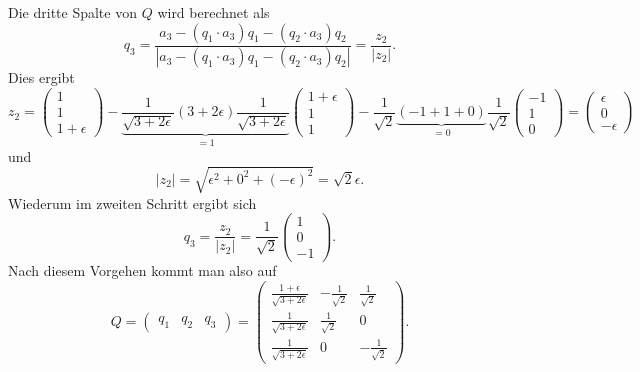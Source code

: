 Die dritte Spalte von $Q$ wird berechnet als
\begin{equation*}
q_3=\frac{a_3-(q_1\cdot a_3)q_1-(q_2\cdot a_3)q_2}{|a_3-(q_1\cdot a_3)q_1-(q_2\cdot a_3)q_2|}=\frac{z_2}{|z_2|}.
\end{equation*}
Dies ergibt
\begin{equation*}
z_2=
\begin{pmatrix}
1\\
1\\
1+\epsilon
\end{pmatrix}-\underbrace{\frac{1}{\sqrt{3+2\epsilon}}(3+2\epsilon)\frac{1}{\sqrt{3+2\epsilon}}}_{\displaystyle=1}
\begin{pmatrix}
1+\epsilon\\
1\\
1
\end{pmatrix}-\frac{1}{\sqrt{2}}\underbrace{(-1+1+0)}_{\displaystyle=0}\frac{1}{\sqrt{2}}
\begin{pmatrix}
-1\\
1\\
0
\end{pmatrix}=
\begin{pmatrix}
\epsilon\\
0\\
-\epsilon
\end{pmatrix}
\end{equation*}
und
\begin{equation*}
|z_2|=\sqrt{\epsilon^2+0^2+(-\epsilon)^2}=\sqrt{2}\epsilon.
\end{equation*}
Wiederum im zweiten Schritt ergibt sich
\begin{equation*}
q_3=\frac{z_2}{|z_2|}=\frac{1}{\sqrt{2}}
\begin{pmatrix}
1\\
0\\
-1
\end{pmatrix}.
\end{equation*}
Nach diesem Vorgehen kommt man also auf
\begin{equation}
Q=
\begin{pmatrix}
q_1&q_2&q_3
\end{pmatrix}=
\begin{pmatrix}
\frac{1+\epsilon}{\sqrt{3+2\epsilon}}&-\frac{1}{\sqrt{2}}&\frac{1}{\sqrt{2}}\\
\frac{1}{\sqrt{3+2\epsilon}}&\frac{1}{\sqrt{2}}&0\\
\frac{1}{\sqrt{3+2\epsilon}}&0&-\frac{1}{\sqrt{2}}
\end{pmatrix}\label{qr:qsol}.
\end{equation}

